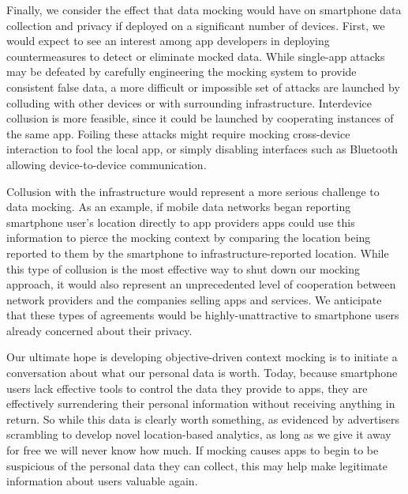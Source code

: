 Finally, we consider the effect that data mocking would have on smartphone
data collection and privacy if deployed on a significant number of devices.
First, we would expect to see an interest among app developers in deploying
countermeasures to detect or eliminate mocked data. While single-app attacks
may be defeated by carefully engineering the mocking system to provide
consistent false data, a more difficult or impossible set of attacks are
launched by colluding with other devices or with surrounding infrastructure.
Interdevice collusion is more feasible, since it could be launched by
cooperating instances of the same app. Foiling these attacks might require
mocking cross-device interaction to fool the local app, or simply disabling
interfaces such as Bluetooth allowing device-to-device communication.

Collusion with the infrastructure would represent a more serious challenge to
data mocking. As an example, if mobile data networks began reporting
smartphone user's location directly to app providers apps could use this
information to pierce the mocking context by comparing the location being
reported to them by the smartphone to infrastructure-reported location. While
this type of collusion is the most effective way to shut down our mocking
approach, it would also represent an unprecedented level of cooperation
between network providers and the companies selling apps and services. We
anticipate that these types of agreements would be highly-unattractive to
smartphone users already concerned about their privacy.

\newpage

Our ultimate hope is developing objective-driven context mocking is to
initiate a conversation about what our personal data is worth. Today, because
smartphone users lack effective tools to control the data they provide to
apps, they are effectively surrendering their personal information without
receiving anything in return. So while this data is clearly worth something,
as evidenced by advertisers scrambling to develop novel location-based
analytics, as long as we give it away for free we will never know how much.
If mocking causes apps to begin to be suspicious of the personal data they
can collect, this may help make legitimate information about users valuable
again.
